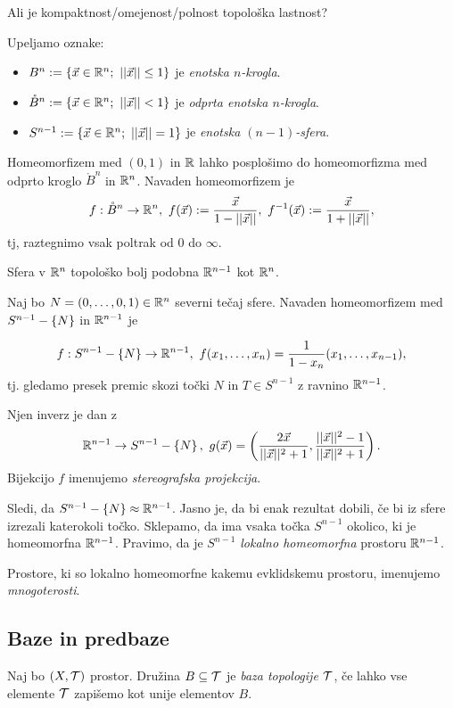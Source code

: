 \begin{primer}
    Ali je kompaktnost/omejenost/polnost topološka lastnost?
\end{primer}

Upeljamo oznake:
\begin{itemize}
    \item $B^n := \set{\vec{x} \in \RR^n; \ ||\vec{x}|| \leq 1}$ je \emph{enotska $n$-krogla}.
    \item $\mathring{B}^n := \left\{\vec{x} \in \mathbb{R}^n; \ ||\vec{x}|| < 1\right\}$ je \emph{odprta enotska $n$-krogla}.
    \item $S^{n-1} := \set{\vec{x} \in \RR^n; \ ||\vec{x}|| = 1}$ je \emph{enotska $(n-1)$-sfera}.
\end{itemize}

Homeomorfizem med $(0, 1)$ in $\mathbb{R}$ lahko posplošimo do homeomorfizma med odprto kroglo $\mathring{B}^n$ in $\mathbb{R}^n$. Navaden homeomorfizem je
$$f: \mathring{B}^n \to \mathbb{R}^n, \ f(\vec{x}) := \frac{\vec{x}}{1 - ||\vec{x}||}, \ f^{-1}(\vec{x}) := \frac{\vec{x}}{1 + ||\vec{x}||},$$
tj, raztegnimo vsak poltrak od $0$ do $\infty$.

Sfera v $\mathbb{R}^n$ topološko bolj podobna $\mathbb{R}^{n-1}$ kot $\mathbb{R}^n$.

Naj bo $N = (0, \ldots, 0, 1) \in \mathbb{R}^n$ severni tečaj sfere. Navaden homeomorfizem med $S^{n-1} - \left\{N\right\}$ in $\mathbb{R}^{n-1}$ je 

$$f: S^{n-1} - \set{N} \to \RR^{n-1}, \ f(x_1, \ldots, x_n) = \frac{1}{1 - x_n}(x_1, \ldots, x_{n-1}),$$
tj. gledamo presek premic skozi točki $N$ in $T \in S^{n-1}$ z ravnino $\mathbb{R}^{n-1}$.

Njen inverz je dan z
$$\mathbb{R}^{n-1} \to S^{n-1} - \left\{N\right\},\  g(\vec{x}) = \left(\frac{2\vec{x}}{||\vec{x}||^2 + 1}, \frac{||\vec{x}||^2-1}{||\vec{x}||^2+1}\right).$$
Bijekcijo $f$ imenujemo \emph{stereografska projekcija}.

Sledi, da $S^{n-1} - \left\{N\right\} \approx \mathbb{R}^{n-1}$. Jasno je, da bi enak rezultat dobili, če bi iz sfere izrezali katerokoli točko. Sklepamo, da ima vsaka točka $S^{n-1}$ okolico, ki je homeomorfna $\mathbb{R}^{n-1}$. Pravimo, da je $S^{n-1}$ \emph{lokalno homeomorfna} prostoru $\mathbb{R}^{n-1}$.

\begin{definicija}
    Prostore, ki so lokalno homeomorfne kakemu evklidskemu prostoru, imenujemo \emph{mnogoterosti}.
\end{definicija}

\subsection{Baze in predbaze}
\begin{definicija}
    Naj bo $(X, \mathcal{T})$ prostor. Družina $B \subseteq \mathcal{T}$ je \emph{baza topologije $\mathcal{T}$}, če lahko vse elemente $\mathcal{T}$ zapišemo kot unije elementov $B$.
\end{definicija}

